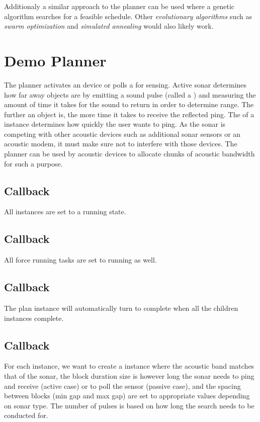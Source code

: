 Additionaly a similar approach to the  planner can be used where a genetic algorithm searches for a feasible schedule. Other \textit{evolutionary algorithms} such as \textit{swarm optimization} and \textit{simulated annealing} would also likely work.

\section{Demo  Planner}
The  planner activates an  device or polls a  for sensing. Active sonar determines how far away objects are by emitting a sound pulse (called a ) and measuring the amount of time it takes for the sound to return in order to determine range. The further an object is, the more time it takes to receive the reflected ping. The  of a  instance determines how quickly the user wants to ping. As the sonar is competing with other acoustic devices such as additional sonar sensors or an acoustic modem, it must make sure not to interfere with those devices. The  planner can be used by acoustic devices to allocate chunks of acoustic bandwidth for such a purpose.

\subsection{Callback }
All instances are set to a running state.

\subsection{Callback }
All force running tasks are set to running as well.

\subsection{Callback }
The plan instance will automatically turn to complete when all the  children instances complete.

\subsection{Callback }
For each  instance, we want to create a  instance where the acoustic band matches that of the sonar, the block duration size is however long the sonar needs to ping and receive (active case) or to poll the sensor (passive case), and the spacing between blocks (min gap and max gap) are set to appropriate values depending on sonar type. The number of pulses is based on how long the search needs to be conducted for.

